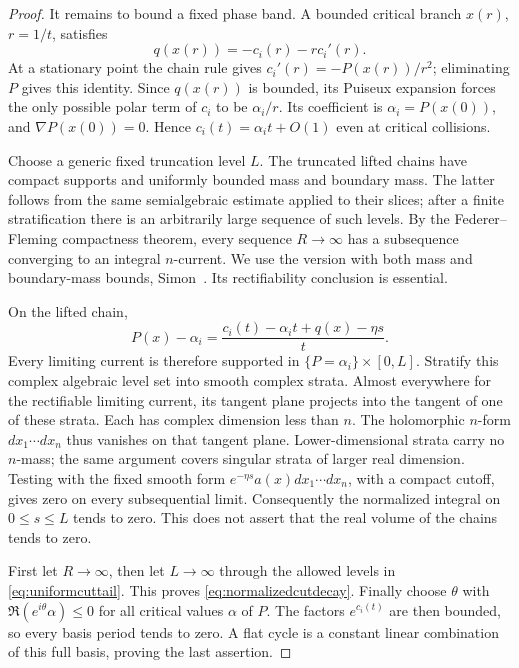 \begin{proof}
It remains to bound a fixed phase band. A bounded critical branch
$x(r)$, $r=1/t$, satisfies
\[
 q(x(r))=-c_i(r)-r c_i'(r).
\]
At a stationary point the chain rule gives $c_i'(r)=-P(x(r))/r^2$;
eliminating $P$ gives this identity. Since $q(x(r))$ is
bounded, its Puiseux expansion forces the only possible polar
term of $c_i$ to be $\alpha_i/r$. Its coefficient is
$\alpha_i=P(x(0))$, and $\nabla P(x(0))=0$. Hence
$c_i(t)=\alpha_i t+O(1)$ even at critical collisions.

Choose a generic fixed truncation level $L$. The truncated lifted
chains have compact supports and uniformly bounded mass and
boundary mass. The latter follows from the same semialgebraic
estimate applied to their slices; after a finite stratification
there is an arbitrarily large sequence of such levels. By the
Federer--Fleming compactness theorem, every sequence $R\to\infty$
has a subsequence converging to an integral $n$-current. We use
the version with both mass and boundary-mass bounds,
Simon~\cite[Chapter~6, Section~3, Theorem~3.15]{SimonGMT}.
Its rectifiability conclusion is essential.

On the lifted chain,
\[
 P(x)-\alpha_i=
       \frac{c_i(t)-\alpha_i t+q(x)-\eta s}{t}.
\]
Every limiting current is therefore supported in
$\{P=\alpha_i\}\times[0,L]$. Stratify this complex algebraic
level set into smooth complex strata. Almost everywhere for the
rectifiable limiting current, its tangent plane projects into
the tangent of one of these strata. Each has complex dimension
less than $n$. The holomorphic $n$-form $dx_1\cdots dx_n$ thus
vanishes on that tangent plane. Lower-dimensional strata carry
no $n$-mass; the same argument covers singular strata of larger
real dimension. Testing with the fixed smooth form
$e^{-\eta s}a(x)dx_1\cdots dx_n$, with a compact cutoff, gives
zero on every subsequential limit. Consequently the normalized
integral on $0\le s\le L$ tends to zero. This does not assert
that the real volume of the chains tends to zero.

First let $R\to\infty$, then let $L\to\infty$ through the
allowed levels in \eqref{eq:uniformcuttail}. This proves
\eqref{eq:normalizedcutdecay}. Finally choose $\theta$ with
$\Re(e^{i\theta}\alpha)\le0$ for all critical values $\alpha$
of $P$. The factors $e^{c_i(t)}$ are then bounded, so every basis
period tends to zero. A flat cycle is a constant linear
combination of this full basis, proving the last assertion.
\end{proof}


